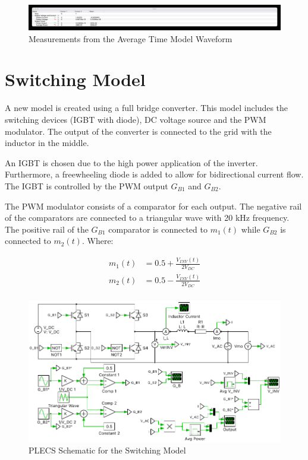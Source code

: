 \documentclass[12pt]{article}
\begin{document}
\begin{figure}[ht]
    \centering{}
    \includegraphics[width=\textwidth, height=0.4\textheight, keepaspectratio]{img/Average Timer Power Cursor.jpg}
    \caption{Measurements from the Average Time Model Waveform}
    \label{fig:avg-time-cursor}
\end{figure}

\section{Switching Model}

A new model is created using a full bridge converter.
This model includes the switching devices (IGBT with diode), DC voltage source and the PWM modulator.
The output of the converter is connected to the grid with the inductor in the middle.

An IGBT is chosen due to the high power application of the inverter.
Furthermore, a freewheeling diode is added to allow for bidirectional current flow.
The IGBT is controlled by the PWM output $G_{B1}$ and $G_{B2}$.

The PWM modulator consists of a comparator for each output.
The negative rail of the comparators are connected to a triangular wave with 20 kHz frequency.
The positive rail of the $G_{B1}$ comparator is connected to $m_1(t)$ while $G_{B2}$ is connected to $m_2(t)$.
Where:

\begin{equation}
    \begin{aligned}
        m_1(t) & = 0.5 + \frac{V_{INV}(t)}{2 V_{DC}} \\
        m_2(t) & = 0.5 - \frac{V_{INV}(t)}{2 V_{DC}} \\
    \end{aligned}
\end{equation}

\begin{figure}[ht]
    \centering{}
    \includegraphics[width=\textwidth, height=0.4\textheight, keepaspectratio]{img/Switching Model.pdf}
    \caption{PLECS Schematic for the Switching Model}
    \label{fig:switching-model}
\end{figure}
\end{document}
